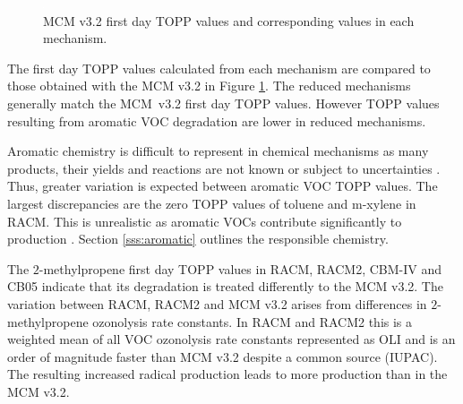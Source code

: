 \begin{figure}
    \centering
    \includegraphics[width=\textwidth]{img/first_day_values}
    \vspace{1mm}
    \caption{MCM v3.2 first day TOPP values and corresponding values in each mechanism.}
    \vspace{-4mm}
    \label{f:first_day}
\end{figure}

The first day TOPP values calculated from each mechanism are compared to those obtained with the MCM v3.{2} in Figure \ref{f:first_day}. 
The reduced mechanisms generally match the \mbox{MCM v3.2} first day TOPP values. 
However TOPP values resulting from aromatic VOC degradation are lower in reduced mechanisms.

Aromatic chemistry is difficult to represent in chemical mechanisms as many products, their yields and reactions are not known or subject to uncertainties \citep{Vereecken:2012}. 
Thus, greater variation is expected between aromatic VOC TOPP values.
The largest discrepancies are the zero TOPP values of toluene and m-xylene in RACM. 
This is unrealistic as aromatic VOCs contribute significantly to  production \citep{Derwent:1998}. 
Section \ref{sss:aromatic} outlines the responsible chemistry.

The $2$-methylpropene first day TOPP values in RACM, RACM2, CBM-IV and CB05 indicate that its degradation is treated differently to the MCM v3.2. 
The variation between RACM, RACM2 and MCM v3.2 arises from differences in $2$-methylpropene ozonolysis rate constants.
In RACM and RACM2 this is a weighted mean of all VOC ozonolysis rate constants represented as OLI \citep{Stockwell:1997, Goliff:2013} and is an order of magnitude faster than MCM v3.2 despite a common source (IUPAC).
The resulting increased radical production leads to more  production than in the MCM v3.2.


